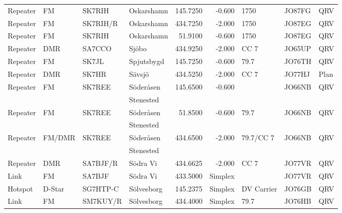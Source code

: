 \begin{landscape}
\begin{longtable}{llllrrlll}
Repeater & FM              & SK7RIH   & Oskarshamn   & 145.7250     & -0.600     & 1750         & JO87FG      & QRV      \\
Repeater & FM              & SK7RIH/R & Oskarshamn   & 434.7250     & -2.000     & 1750         & JO87EG      & QRV      \\
Repeater & FM              & SK7RIH   & Oskarshamn   & 51.9100      & -0.600     & 1750         & JO87EG      & QRV      \\
Repeater & DMR             & SA7CCO   & Sjöbo        & 434.9250     & -2.000     & CC 7         & JO65UP      & QRV      \\
Repeater & FM              & SK7JL    & Spjutsbygd   & 145.7250     & -0.600     & 79.7         & JO76TH      & QRV      \\
Repeater & DMR             & SK7HR    & Sävsjö       & 434.5250     & -2.000     & CC 7         & JO77HJ      & Plan     \\
Repeater & FM              & SK7REE   & Söderåsen    & 145.6500     & -0.600     &              & JO66NB      & QRV      \\
         &                 &          & Stenested    &              &            &              &             &          \\
Repeater & FM              & SK7REE   & Söderåsen    & 51.8500      & -0.600     & 79.7         & JO66NB      & QRV      \\
         &                 &          & Stenested    &              &            &              &             &          \\
Repeater & FM/DMR          & SK7REE   & Söderåsen    & 434.6500     & -2.000     & 79.7/CC 7    & JO66NB      & QRV      \\
         &                 &          & Stenested    &              &            &              &             &          \\
Repeater & DMR             & SA7BJF/R & Södra Vi     & 434.6625     & -2.000     & CC 7         & JO77VR      & QRV      \\
Link     & FM              & SA7BJF   & Södra Vi     & 433.5000     & Simplex    &              & JO77VR      & QRV      \\
Hotspot  & D-Star          & SG7HTP-C & Sölvesborg   & 145.2375     & Simplex    & DV Carrier   & JO76GB      & QRV      \\
Link     & FM              & SM7KUY/R & Sölvesborg   & 434.4000     & Simplex    & 79.7         & JO76HB      & QRV      \\

\end{longtable}
\end{landscape}
